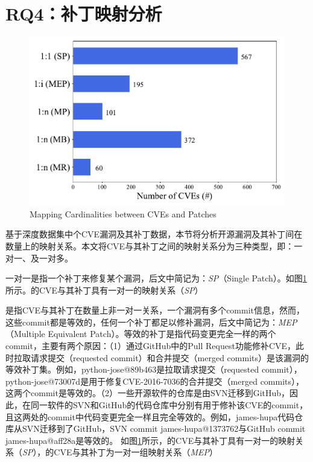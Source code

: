 \section{RQ4：补丁映射分析}\label{sec:cardinality}
\begin{figure}[!t]
\centering
\includegraphics[scale=0.5]{res/rq4-cardinality.pdf}
\vspace{-10pt}
\caption{Mapping Cardinalities between CVEs and Patches}\label{fig:rq4-cardinality}
\end{figure}

基于深度数据集中个CVE漏洞及其补丁数据，本节将分析开源漏洞及其补丁间在数量上的映射关系。本文将CVE与其补丁之间的映射关系分为三种类型，即：一对一、及一对多。

一对一是指一个补丁来修复某个漏洞，后文中简记为：\textit{SP}（Single Patch）。如图\ref{fig:rq4-cardinality}所示。的CVE与其补丁具有一对一的映射关系（\textit{SP}）

是指CVE与其补丁在数量上非一对一关系，一个漏洞有多个commit信息，然而，这些commit都是等效的，任何一个补丁都足以修补漏洞，后文中简记为：\textit{MEP}（Multiple Equivalent Patch）。等效的补丁是指代码变更完全一样的两个commit，主要有两个原因：（1）通过GitHub中的Pull Request功能修补CVE，此时拉取请求提交（requested commit）和合并提交（merged commits）是该漏洞的等效补丁集。例如，python-jose@89b463\cite{python-jose-1}是拉取请求提交（requested commit），python-jose@73007d\cite{python-jose-2}是用于修复CVE-2016-7036的合并提交（merged commits），这两个commit是等效的。（2）一些开源软件的仓库是由SVN迁移到GitHub，因此，在同一软件的SVN和GitHub的代码仓库中分别有用于修补该CVE的commit，且这两处的commit中代码变更完全一样且完全等效的。例如，james-hupa代码仓库从SVN迁移到了GitHub，SVN commit james-hupa@1373762\cite{james-hupa-1}与GitHub commit james-hupa@aff28a\cite{james-hupa-2}是等效的。
如图\ref{fig:rq4-cardinality}所示，的CVE与其补丁具有一对一的映射关系（\textit{SP}），的CVE与其补丁为一对一组映射关系（\textit{MEP}）


